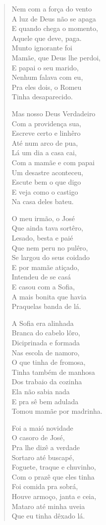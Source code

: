 \begin{verse}
Nem com a força do vento\\
A luz de Deus não se apaga\\
E quando chega o momento,\\
Aquele que deve, paga.\\
Munto ignorante foi\\
Mamãe, que Deus lhe perdoi,\\
E papai o seu marido,\\
Nenhum falava com eu,\\
Pra eles dois, o Romeu\\
Tinha desaparecido.

Mas nosso Deus Verdadeiro\\
Com a providença sua,\\
Escreve certo e linhêro\\
Até num arco de pua,\\
Lá um dia a casa cai,\\
Com a mamãe e com papai\\
Um desastre aconteceu,\\
Escute bem o que digo\\
E veja como o castigo\\
Na casa deles bateu.

O meu irmão, o José\\
Que ainda tava sortêro,\\
Lesado, besta e paié\\
Que nem peru no pulêro,\\
Se largou do seus coidado\\
E por mamãe atiçado,\\
Intendeu de se casá\\
E casou com a Sofia,\\
A mais bonita que havia\\
Praquelas banda de lá.

A Sofia era alinhada\\
Branca do cabelo lôro,\\
Diciprinada e formada\\
Nas escola de namoro,\\
O que tinha de fromosa,\\
Tinha também de manhosa\\
Dos trabaio da cozinha\\
Ela não sabia nada\\
E pra sê bem adulada\\
Tomou mamãe por madrinha.

Foi a maió novidade\\
O casoro de José,\\
Pra lhe dizê a verdade\\
Sortaro até buscapé,\\
Foguete, traque e chuvinho,\\
Com o prazê que eles tinha\\
Foi comida pra sobrá,\\
Houve armoço, janta e ceia,\\
Mataro até minha uveia\\
Que eu tinha dêxado lá.


\end{verse}
